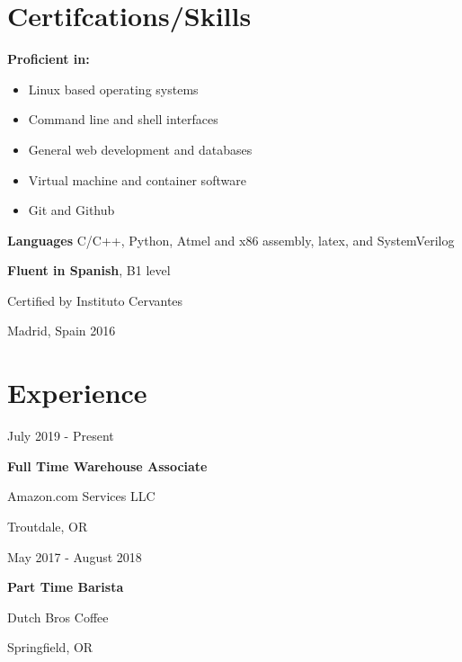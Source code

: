 \documentclass[12pt,letterpaper]{article}
\begin{document}
	\begin{minipage}[t]{0.4\linewidth}


	\section*{Certifcations/Skills}

	\textbf{Proficient in:} 
	\begin{itemize}
		\item Linux based operating systems
		\item Command line and shell interfaces
		\item General web development and databases
		\item Virtual machine and container software
		\item Git and Github
	\end{itemize}
	\vspace{0.5cm}
	
	\textbf{Languages}
	C/C++, Python, Atmel and x86 assembly, latex, and SystemVerilog
	\vspace{0.5cm}

	\textbf{Fluent in Spanish}, B1 level

	Certified by Instituto Cervantes

	Madrid, Spain 2016


	\section*{Experience}
	July 2019 - Present
	
	\textbf{Full Time Warehouse Associate}
	
	Amazon.com Services LLC

	Troutdale, OR

	\hspace{1cm}
	
	May 2017 - August 2018 
	
	\textbf{Part Time Barista}

	Dutch Bros Coffee 

	Springfield, OR 
	
	\end{minipage}
\end{document}

